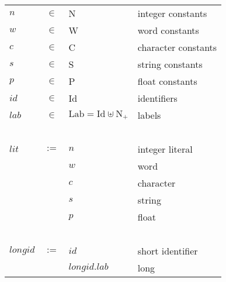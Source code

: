 \documentclass[twoside]{article}
\newcommand{\x}[1]{\mathit{#1}}
\newcommand{\f}[1]{\mbox{#1}}
\newcommand{\lab}{\x{lab}}
\newcommand{\id}{\x{id}}
\newcommand{\longid}{\x{longid}}
\newcommand{\lit}{\x{lit}}
\begin{document}
\begin{center}
\begin{tabular}{lcll}
$\x{n}$	&$\in$&	\f{N}				& integer constants \\
$\x{w}$	&$\in$&	\f{W}				& word constants \\
$\x{c}$	&$\in$&	\f{C}				& character constants \\
$\x{s}$	&$\in$&	\f{S}				& string constants \\
$\x{p}$	&$\in$&	\f{P}				& float constants \\
$\id$	&$\in$&	\f{Id}				& identifiers \\
$\lab$	&$\in$&	$\f{Lab}=\f{Id}\uplus\f{N}_+$	& labels \\
\ \\

$\lit$	&$:=$&	$n$				& integer literal \\
	&&	$\x{w}$				& word \\
	&&	$\x{c}$				& character \\
	&&	$\x{s}$				& string \\
	&&	$\x{p}$				& float \\
\ \\

$\longid$	&$:=$&	$\id$			& short identifier \\
	&&	$\longid.\lab$			& long \\
\end{tabular}
\end{center}
\end{document}
